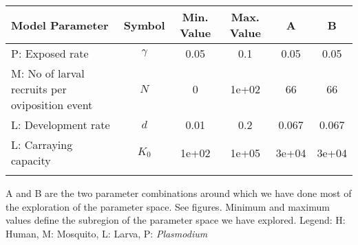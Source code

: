 \begin{table}
\noindent
\begin{tabular}{p{5cm}ccccc}
{\bf Model Parameter} & {\bf Symbol} & {\bf Min. Value} & {\bf Max. Value} & {\bf A} & {\bf B}\\
\hline\hline
  P: Exposed rate & $\gamma$ & 0.05 &  0.1 & 0.05 & 0.05\\
  M: No of larval recruits per oviposition event & $N$ &    0 & 1e+02 &   66 &   66\\
  L: Development rate & $d$ & 0.01 &  0.2 & 0.067 & 0.067\\
  L: Carraying capacity & $K_0$ & 1e+02 & 1e+05 & 3e+04 & 3e+04\\
\hline\hline
\smallskip
\end{tabular}
 A and B are the two parameter combinations around which we have done most of the exploration of the parameter space. See figures. Minimum and maximum values define the subregion of the parameter space we have explored. Legend: {\small H: Human, M: Mosquito, L: Larva, P: {\em Plasmodium}} 
\end{table}
